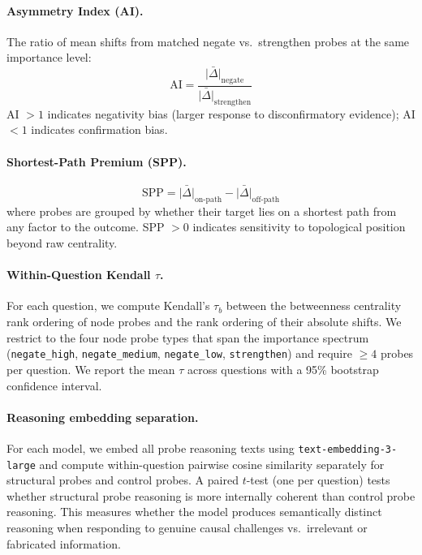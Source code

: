 \documentclass[11pt]{article}
\begin{document}
\paragraph{Asymmetry Index (AI).}
The ratio of mean shifts from matched negate vs.\ strengthen probes at the same importance level:
\begin{equation}
    \text{AI} = \frac{\bar{|\Delta|}_{\text{negate}}}{\bar{|\Delta|}_{\text{strengthen}}}
\end{equation}
AI $> 1$ indicates negativity bias (larger response to disconfirmatory evidence); AI $< 1$ indicates confirmation bias.

\paragraph{Shortest-Path Premium (SPP).}
\begin{equation}
    \text{SPP} = \bar{|\Delta|}_{\text{on-path}} - \bar{|\Delta|}_{\text{off-path}}
\end{equation}
where probes are grouped by whether their target lies on a shortest path from any factor to the outcome. SPP $> 0$ indicates sensitivity to topological position beyond raw centrality.

\paragraph{Within-Question Kendall $\tau$.}
For each question, we compute Kendall's $\tau_b$ between the betweenness centrality rank ordering of node probes and the rank ordering of their absolute shifts. We restrict to the four node probe types that span the importance spectrum (\texttt{negate\_high}, \texttt{negate\_medium}, \texttt{negate\_low}, \texttt{strengthen}) and require $\geq 4$ probes per question. We report the mean $\tau$ across questions with a 95\% bootstrap confidence interval.

\paragraph{Reasoning embedding separation.}
For each model, we embed all probe reasoning texts using \texttt{text-embedding-3-large} and compute within-question pairwise cosine similarity separately for structural probes and control probes. A paired $t$-test (one per question) tests whether structural probe reasoning is more internally coherent than control probe reasoning. This measures whether the model produces semantically distinct reasoning when responding to genuine causal challenges vs.\ irrelevant or fabricated information.
\end{document}
